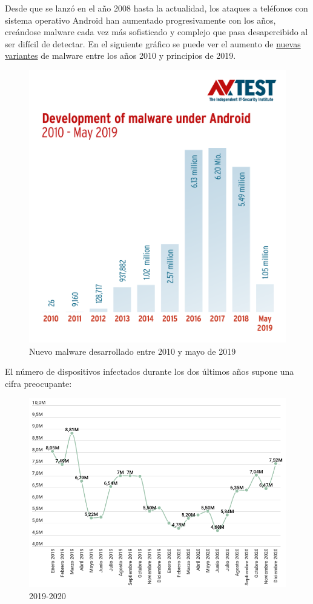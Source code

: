 Desde que se lanzó en el año 2008 hasta la actualidad, los ataques a teléfonos con sistema operativo Android han aumentado progresivamente con los años, creándose malware cada vez más sofisticado y complejo que pasa desapercibido al ser difícil de detectar. En el siguiente gráfico se puede ver el aumento de \underline{nuevas variantes} de malware entre los años 2010 y principios de 2019.

\begin{figure}[H]
\centering
	\includegraphics[scale=0.15]{img/2010-mayo2019.png}
	\caption{Nuevo malware desarrollado entre 2010 y mayo de 2019}
\end{figure}

El número de dispositivos infectados durante los dos últimos años supone una cifra preocupante:

\begin{figure}[H]
\centering
	\includegraphics[scale=0.25]{img/2019-2020.png}
	\caption{2019-2020}
\end{figure}

